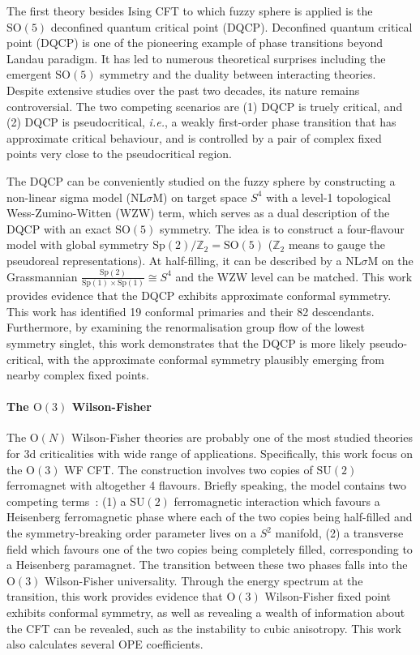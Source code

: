 \documentclass{timesjhep}
\begin{document}
The first theory besides Ising CFT to which fuzzy sphere is applied is the $\mathrm{SO}(5)$ deconfined quantum critical point (DQCP). Deconfined quantum critical point (DQCP) is one of the pioneering example of phase transitions beyond Landau paradigm. It has led to numerous theoretical surprises including the emergent $\mathrm{SO}(5)$ symmetry and the duality between interacting theories. Despite extensive studies over the past two decades, its nature remains controversial. The two competing scenarios are (1) DQCP is truely critical, and (2) DQCP is pseudocritical, \textit{i.e.}, a weakly first-order phase transition that has approximate critical behaviour, and is controlled by a pair of complex fixed points very close to the pseudocritical region. 

The DQCP can be conveniently studied on the fuzzy sphere by constructing a non-linear sigma model (NL$\sigma$M) on target space $S^4$ with a level-1 topological Wess-Zumino-Witten (WZW) term, which serves as a dual description of the DQCP with an exact $\mathrm{SO}(5)$ symmetry. The idea is to construct a four-flavour model with global symmetry $\mathrm{Sp}(2)/\mathbb{Z}_2=\mathrm{SO}(5)$ ($\mathbb{Z}_2$ means to gauge the pseudoreal representations). At half-filling, it can be described by a NL$\sigma$M on the Grassmannian $\tfrac{\mathrm{Sp}(2)}{\mathrm{Sp}(1)\times\mathrm{Sp}(1)}\cong S^4$ and the WZW level can be matched. This work provides evidence that the DQCP exhibits approximate conformal symmetry. This work has identified 19 conformal primaries and their 82 descendants. Furthermore, by examining the renormalisation group flow of the lowest symmetry singlet, this work demonstrates that the DQCP is more likely pseudo-critical, with the approximate conformal symmetry plausibly emerging from nearby complex fixed points. 

\paragraph{The $\mathrm{O}(3)$ Wilson-Fisher~\cite{Han2023Dec}}

The $\mathrm{O}(N)$ Wilson-Fisher theories are probably one of the most studied theories for 3d criticalities with wide range of applications. Specifically, this work focus on the $\mathrm{O}(3)$ WF CFT. The construction involves two copies of $\mathrm{SU}(2)$ ferromagnet with altogether 4 flavours. Briefly speaking, the model contains two competing terms~: (1) a $\mathrm{SU}(2)$ ferromagnetic interaction which favours a Heisenberg ferromagnetic phase where each of the two copies being half-filled and the symmetry-breaking order parameter lives on a $S^2$ manifold, (2) a transverse field which favours one of the two copies being completely filled, corresponding to a Heisenberg paramagnet. The transition between these two phases falls into the $\mathrm{O}(3)$ Wilson-Fisher universality. Through the energy spectrum at the transition, this work provides evidence that $\mathrm{O}(3)$ Wilson-Fisher fixed point exhibits conformal symmetry, as well as revealing a wealth of information about the CFT can be revealed, such as the instability to cubic anisotropy. This work also calculates several OPE coefficients. 
\end{document}
